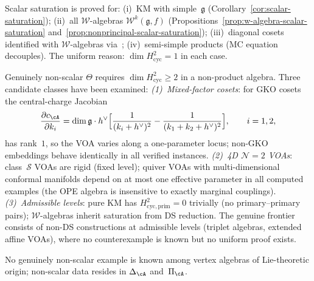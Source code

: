 \begin{remark}
\label{rem:scalar-saturation-scope}
Scalar saturation is proved for:
(i)~KM with simple~$\mathfrak{g}$ (Corollary~\ref{cor:scalar-saturation});
(ii)~all $\mathcal{W}$-algebras $\mathcal{W}^k(\mathfrak{g},f)$
(Propositions~\ref{prop:w-algebra-scalar-saturation}
and~\ref{prop:nonprincipal-scalar-saturation});
(iii)~diagonal cosets identified with $\mathcal{W}$-algebras via~\cite{ACL19};
(iv)~semi-simple products (MC equation decouples).
The uniform reason: $\dim H^2_{\mathrm{cyc}} = 1$ in each case.

Genuinely non-scalar $\Theta$ requires $\dim H^2_{\mathrm{cyc}} \geq 2$
in a non-product algebra.  Three candidate classes have been examined:
\emph{(1)~Mixed-factor cosets}: for GKO cosets the central-charge Jacobian
\[
\frac{\partial c_{\cA}}{\partial k_i}
= \dim\mathfrak{g} \cdot h^\vee
\Bigl[\frac{1}{(k_i + h^\vee)^2}
- \frac{1}{(k_1 + k_2 + h^\vee)^2}\Bigr],
\qquad i = 1, 2,
\]
has rank~$1$, so the VOA varies along a one-parameter locus;
non-GKO embeddings behave identically in all verified instances.
\emph{(2)~4D $\mathcal{N}=2$ VOAs}: class~$\mathcal{S}$ VOAs are rigid
(fixed level); quiver VOAs with multi-dimensional conformal manifolds
depend on at most one effective parameter in all computed examples
(the OPE algebra is insensitive to exactly marginal couplings).
\emph{(3)~Admissible levels}: pure KM has
$H^2_{\mathrm{cyc,prim}} = 0$ trivially (no primary--primary pairs);
$\mathcal{W}$-algebras inherit saturation from DS reduction.
The genuine frontier consists of non-DS constructions at admissible
levels (triplet algebras, extended affine VOAs), where no
counterexample is known but no uniform proof exists.

No genuinely non-scalar example is known among vertex algebras of
Lie-theoretic origin; non-scalar data resides in $\Delta_{\cA}$
and~$\Pi_{\cA}$.
\end{remark}

